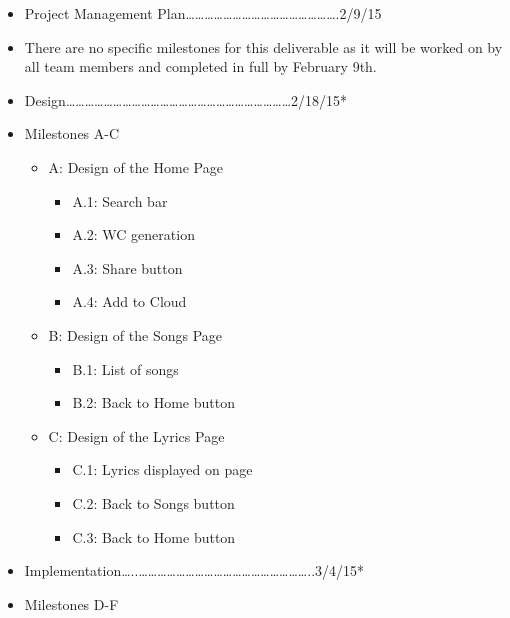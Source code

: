\documentclass[]{article}
\begin{document}
\begin{itemize}
\itemsep1pt\parskip0pt
\item
  Project Management
  Plan\ldots{}\ldots{}\ldots{}\ldots{}\ldots{}\ldots{}\ldots{}\ldots{}\ldots{}\ldots{}\ldots{}\ldots{}\ldots{}\ldots{}\ldots{}\ldots{}.2/9/15
\item
  There are no specific milestones for this deliverable as it will be
  worked on by all team members and completed in full by February 9th.
\item
  Design\ldots{}\ldots{}\ldots{}\ldots{}\ldots{}\ldots{}\ldots{}\ldots{}\ldots{}\ldots{}\ldots{}\ldots{}\ldots{}\ldots{}\ldots{}\ldots{}\ldots{}\ldots{}\ldots{}\ldots{}\ldots{}\ldots{}\ldots{}\ldots{}2/18/15*
\item
  Milestones A-C

  \begin{itemize}
  \itemsep1pt\parskip0pt
  \item
    A: Design of the Home Page

    \begin{itemize}
    \itemsep1pt\parskip0pt
    \item
      A.1: Search bar
    \item
      A.2: WC generation
    \item
      A.3: Share button
    \item
      A.4: Add to Cloud
    \end{itemize}
  \item
    B: Design of the Songs Page

    \begin{itemize}
    \itemsep1pt\parskip0pt
    \item
      B.1: List of songs
    \item
      B.2: Back to Home button
    \end{itemize}
  \item
    C: Design of the Lyrics Page

    \begin{itemize}
    \itemsep1pt\parskip0pt
    \item
      C.1: Lyrics displayed on page
    \item
      C.2: Back to Songs button
    \item
      C.3: Back to Home button
    \end{itemize}
  \end{itemize}
\item
  Implementation\ldots{}..\ldots{}\ldots{}\ldots{}\ldots{}\ldots{}\ldots{}\ldots{}\ldots{}\ldots{}\ldots{}\ldots{}\ldots{}\ldots{}\ldots{}\ldots{}\ldots{}\ldots{}\ldots{}..3/4/15*
\item
  Milestones D-F


\end{itemize}
\end{document}
